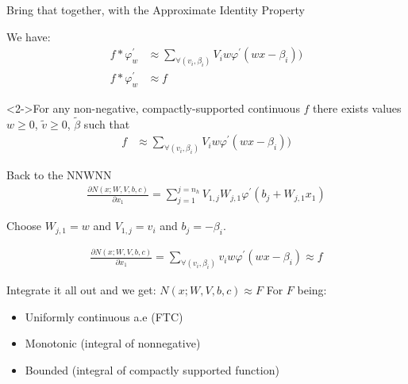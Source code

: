 \documentclass[dvipsnames,handout]{beamer}
\renewcommand{\v}{\varphi}
\newcommand{\vp}{\v^\prime}
\begin{document}
\begin{frame}{Bring that together, with the Approximate Identity Property}
	\begin{block}{We have:}
	\begin{align*}
		f\ast\vp_w &\approx \sum_{\forall (v_i,\beta_i)} V_i w\vp(wx-\beta_i)) \\
		f\ast\vp_w &\approx f 
	\end{align*}
	\end{block}
	
	\begin{block}<2->{For any non-negative, compactly-supported continuous $f$ there exists values $w \ge 0$, $\tilde{v} \ge 0$, $\tilde{\beta}$ such that}
		\begin{align}
			f &\approx \sum_{\forall (v_i,\beta_i)} V_i w\vp(wx-\beta_i))
		\end{align}
	\end{block}
\end{frame}

\begin{frame}{Back to the NNWNN}
		\begin{align*}
			\frac{\partial N(x;W,V,b,c)}{\partial x_1} = \sum_{j=1}^{j=n_h} V_{1,j}W_{j,1} \vp (b_j+W_{j,1}x_1)
		\end{align*}
		\pause
		
		Choose $W_{j,1}=w$ and $V_{1,j}=v_i$ and $b_j=-\beta_i$.
		
		\pause
		
		\begin{align*}
		\frac{\partial N(x;W,V,b,c)}{\partial x_1} = \sum_{\forall (v_i,\beta_i)} v_i w\vp(wx-\beta_i) \approx f
		\end{align*}
		
		\begin{block}{Integrate it all out and we get: $N(x;W,V,b,c)\approx F$}
			For $F$ being:
			\begin{itemize}
				\item Uniformly continuous a.e (FTC)
				\item Monotonic (integral of nonnegative)
				\item Bounded (integral of compactly supported function)
			\end{itemize}
		\end{block}
\end{frame}
\end{document}
